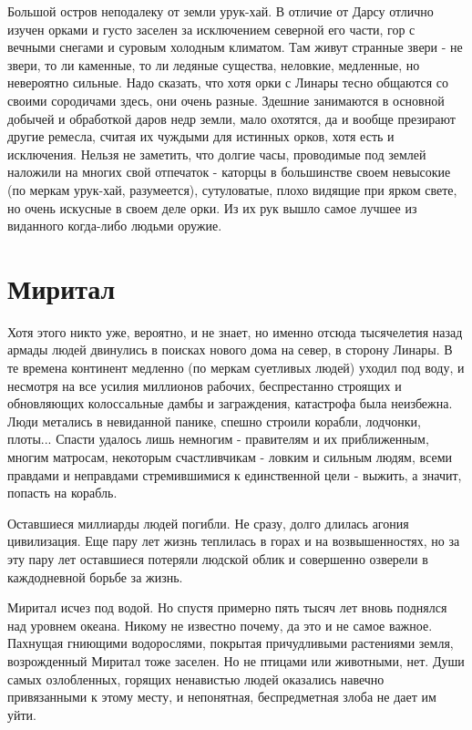 \documentclass[12pt,a4paper]{book}
\begin{document}
Большой остров неподалеку от земли урук-хай. В отличие от Дарсу отлично изучен орками и густо заселен за исключением северной его части, гор с вечными снегами и суровым холодным климатом. Там живут странные звери - не звери, то ли каменные, то ли ледяные существа, неловкие, медленные, но невероятно сильные. Надо сказать, что хотя орки с Линары тесно общаются со своими сородичами здесь, они очень разные. Здешние занимаются в основной добычей и обработкой даров недр земли, мало охотятся, да и вообще презирают другие ремесла, считая их чуждыми для истинных орков, хотя есть и исключения. Нельзя не заметить, что долгие часы, проводимые под землей наложили на многих свой отпечаток - каторцы в большинстве своем невысокие (по меркам урук-хай, разумеется), сутуловатые, плохо видящие при ярком свете, но очень искусные в своем деле орки. Из их рук вышло самое лучшее из виданного когда-либо людьми оружие.

\chapter{Миритал}

Хотя этого никто уже, вероятно, и не знает, но именно отсюда тысячелетия назад армады людей двинулись в поисках нового дома на север, в сторону Линары. В те времена континент медленно (по меркам суетливых людей) уходил под воду, и несмотря на все усилия миллионов рабочих, беспрестанно строящих и обновляющих колоссальные дамбы и заграждения, катастрофа была неизбежна. Люди метались в невиданной панике, спешно строили корабли, лодчонки, плоты... Спасти удалось лишь немногим - правителям и их приближенным, многим матросам, некоторым счастливчикам - ловким и сильным людям, всеми правдами и неправдами стремившимися к единственной цели - выжить, а значит, попасть на корабль.

Оставшиеся миллиарды людей погибли. Не сразу, долго длилась агония цивилизация. Еще пару лет жизнь теплилась в горах и на возвышенностях, но за эту пару лет оставшиеся потеряли людской облик и совершенно озверели в каждодневной борьбе за жизнь.

Миритал исчез под водой. Но спустя примерно пять тысяч лет вновь поднялся над уровнем океана. Никому не известно почему, да это и не самое важное. Пахнущая гниющими водорослями, покрытая причудливыми растениями земля, возрожденный Миритал тоже заселен. Но не птицами или животными, нет. Души самых озлобленных, горящих ненавистью людей оказались навечно привязанными к этому месту, и непонятная, беспредметная злоба не дает им уйти.
\end{document}
